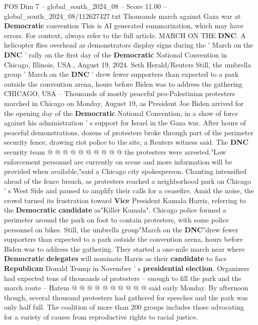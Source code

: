 \begin{textsample}{POS Dim 7 – global\_south\_2024\_08 – Score 11.00 – global\_south\_2024\_08/112627427.txt}  \label{ex:f7_pos_182}
Thousands march against Gaza war at \textbf{Democratic} convention This is AI generated summarization, which may have errors.
For context, always refer to the full article.
MARCH ON THE \textbf{DNC}.
A helicopter flies overhead as demonstrators display signs during the ' March on the \textbf{DNC} ' rally on the first day of the \textbf{Democratic} National Convention in Chicago, Illinois, USA., August 19, 2024.
Seth Herald/Reuters Still, the umbrella group ' March on the \textbf{DNC} ' drew fewer supporters than expected to a park outside the convention arena, hours before Biden was to address the gathering CHICAGO, USA -- Thousands of mostly peaceful pro-Palestinian protesters marched in Chicago on Monday, August 19, as President Joe Biden arrived for the opening day of the \textbf{Democratic} National Convention, in a show of force against his administration ' s support for Israel in the Gaza war.
After hours of peaceful demonstrations, dozens of protesters broke through part of the perimeter security fence, drawing riot police to the site, a Reuters witness said.
The \textbf{DNC} security team @ @ @ @ @ @ @ @ @ @ the protesters were arrested."Law enforcement personnel are currently on scene and more information will be provided when available,"said a Chicago city spokesperson.
Chanting intensified ahead of the fence breach, as protesters reached a neighborhood park on Chicago ' s West Side and paused to amplify their calls for a ceasefire.
Amid the noise, the crowd turned its frustration toward \textbf{Vice} President Kamala Harris, referring to the \textbf{Democratic} \textbf{candidate} as"Killer Kamala".
Chicago police formed a perimeter around the park on foot to contain protesters, with some police personnel on bikes.
Still, the umbrella group"March on the \textbf{DNC}"drew fewer supporters than expected to a park outside the convention arena, hours before Biden was to address the gathering.
They started a one-mile march near where \textbf{Democratic} \textbf{delegates} will nominate Harris as their \textbf{candidate} to face \textbf{Republican} Donald Trump in November ' s \textbf{presidential} \textbf{election}.
Organizers had expected tens of thousands of protesters -- enough to fill the park and the march route -- Hatem @ @ @ @ @ @ @ @ @ @ said early Monday.
By afternoon though, several thousand protesters had gathered for speeches and the park was only half full.
The coalition of more than 200 groups includes those advocating for a variety of causes from reproductive rights to racial justice.

\end{textsample}
